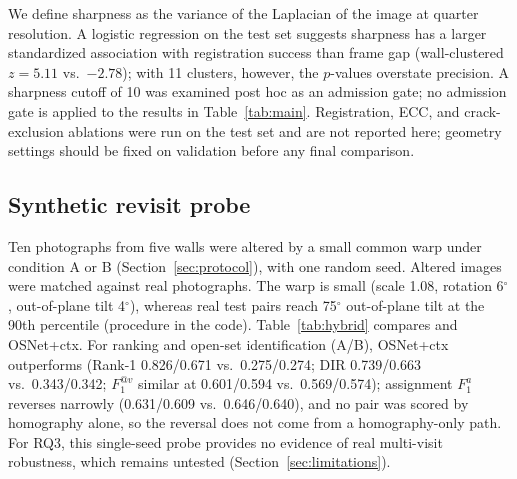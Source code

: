 We define sharpness as the variance of the Laplacian of the image at quarter resolution.
A logistic regression on the test set suggests sharpness has a larger standardized association with registration success than frame gap (wall-clustered $z = 5.11$ vs.\ $-2.78$); with 11 clusters, however, the $p$-values overstate precision. A sharpness cutoff of 10 was examined post hoc as an admission gate; no admission gate is applied to the results in Table~\ref{tab:main}.
Registration, ECC, and crack-exclusion ablations were run on the test set and are not reported here; geometry settings should be fixed on validation before any final comparison.

\subsection{Synthetic revisit probe}
\label{sec:hybridbench}

Ten photographs from five walls were altered by a small common warp under condition A or B (Section~\ref{sec:protocol}), with one random seed.
Altered images were matched against real photographs. The warp is small (scale 1.08, rotation 6$^{\circ}$, out-of-plane tilt 4$^{\circ}$), whereas real test pairs reach 75$^{\circ}$ out-of-plane tilt at the 90th percentile (procedure in the code).
Table~\ref{tab:hybrid} compares \hybrid{} and OSNet+ctx.
For ranking and open-set identification (A/B), OSNet+ctx outperforms \hybrid{} (Rank-1 0.826/0.671 vs.\ 0.275/0.274; DIR 0.739/0.663 vs.\ 0.343/0.342; $F_1^{@v}$ similar at 0.601/0.594 vs.\ 0.569/0.574); assignment $F_1^{a}$ reverses narrowly (0.631/0.609 vs.\ 0.646/0.640), and no pair was scored by homography alone, so the reversal does not come from a homography-only path.
For RQ3, this single-seed probe provides no evidence of real multi-visit robustness, which remains untested (Section~\ref{sec:limitations}).

